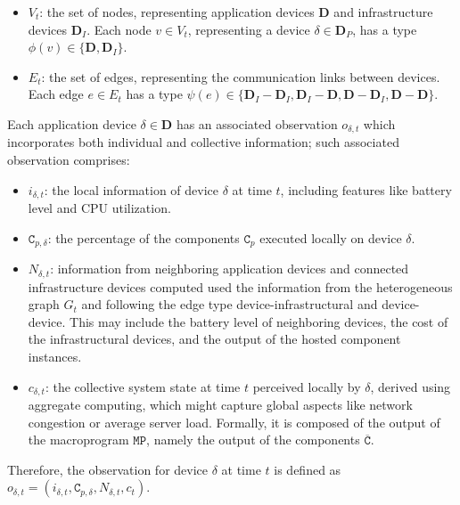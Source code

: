\begin{itemize}
    \item $V_t$: the set of nodes, representing application devices $\mathbf{D}$ and infrastructure devices $\mathbf{D}_I$.
        Each node $v \in V_t$, representing a device $\delta \in \mathbf{D}_P$, has a type $\phi(v) \in \{\mathbf{D}, \mathbf{D}_I\}$.
    \item $E_t$: the set of edges, representing the communication links between devices.
        Each edge $e \in E_t$ has a type $\psi(e) \in \{\mathbf{D}_I-\mathbf{D}_I, \mathbf{D}_I-\mathbf{D}, \mathbf{D}-\mathbf{D}_I, \mathbf{D}-\mathbf{D}\}$.
\end{itemize}

Each application device $\delta \in \mathbf{D}$ has an associated observation $o_{\delta,t}$ 
 which incorporates both individual and collective information;
 such associated observation comprises:
\begin{itemize}
    \item $i_{\delta,t}$: the local information of device $\delta$ at time $t$,
        including features like battery level and CPU utilization.
    \item $\mathtt{C}_{p, \delta}$: the percentage of the components $\mathtt{C}_p$ executed locally on device $\delta$.
    \item $N_{\delta,t}$: information from neighboring application devices and connected infrastructure devices computed used the information from the heterogeneous graph $G_t$ and following the edge type device-infrastructural and device-device.
        This may include the battery level of neighboring devices,
        the cost of the infrastructural devices,
        and the output of the hosted component instances.
    \item $c_{\delta,t}$: the collective system state at time $t$ perceived locally by $\delta$, derived using aggregate computing,
        which might capture global aspects like network congestion or average server load.
        Formally,
        it is composed of the output of the macroprogram $\mathtt{MP}$,
        namely the output of the components $\overline{\mathtt{C}}$.
\end{itemize}
Therefore,
 the observation for device $\delta$ at time $t$ is defined 
 as $o_{\delta,t} = (i_{\delta,t},\mathtt{C}_{p, \delta}, N_{\delta,t}, c_t)$.


